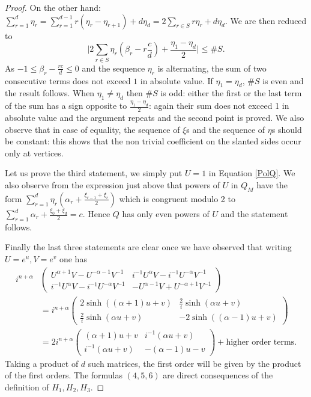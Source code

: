 \documentclass[10pt,a4paper]{amsart}
\begin{document}
\begin{proof}
On the other hand: $\sum_{r=1}^d \eta_r=\sum_{r=1}^{d-1}r(\eta_r-\eta_{r+1})+d\eta_d=2\sum_{r\in S}r\eta_r+d\eta_d$. We are then reduced to 
$$\Big|2\sum_{r\in S}\eta_r(\beta_r-r\frac{c}{d})+\frac{\eta_1-\eta_d}{2}\Big|\le \#S.$$
As $-1\le \beta_r-\frac{rc}{d}\le 0$ and the sequence $\eta_r$ is alternating, the sum of two consecutive terms does not exceed $1$ in absolute value. If $\eta_1=\eta_d$, $\#S$ is even and the result follows. When $\eta_1\ne\eta_d$ then $\#S$ is odd: either the first or the last term of the sum has a sign opposite to $\frac{\eta_1-\eta_d}{2}$: again their sum does not exceed 1 in absolute value and the argument repeats and the second point is proved. 
We also observe that in case of equality, the sequence of $\xi$s and the sequence of $\eta$s should be constant: this shows that the non trivial coefficient on the slanted sides occur only at vertices. 

Let us prove the third statement, we simply put $U=1$ in Equation \eqref{PolQ}. We also observe from the expression just above that powers of $U$ in $Q_M$ have the form $\sum_{r=1}^d \eta_r(\alpha_r+\frac{\xi_{r-1}+\xi_{r}}{2})$ which is congruent modulo 2 to $\sum_{r=1}^{d}\alpha_r+\frac{\xi_0+\xi_d}{2}=c$. Hence $Q$ has only even powers of $U$ and the statement follows. 

Finally the last three statements are clear once we have observed that writing $U=e^u, V=e^v$ one has 
\begin{align*}
i^{n+\alpha}&\begin{pmatrix}U^{\alpha+1}V-U^{-\alpha-1}V^{-1}& i^{-1}U^{\alpha}V-i^{-1}U^{-\alpha}V^{-1}\\ i^{-1}U^{\alpha}V-i^{-1}U^{-\alpha}V^{-1}& -U^{\alpha-1}V+U^{-\alpha+1}V^{-1}\end{pmatrix}\\
&=i^{n+\alpha}\begin{pmatrix} 2\sinh((\alpha+1)u+v) & \frac{2}{i}\sinh(\alpha u+v)\\ \frac{2}{i}\sinh(\alpha u+v) & -2\sinh((\alpha-1)u+v)\end{pmatrix}\\
&=2i^{n+\alpha}\begin{pmatrix} (\alpha+1)u+v & i^{-1}(\alpha u+v)\\ i^{-1}(\alpha u+v) & -(\alpha-1)u-v\end{pmatrix}+\text{higher order terms}.
\end{align*}
Taking a product of $d$ such matrices, the first order will be given by the product of the first orders. The formulas $(4,5,6)$ are direct consequences of the definition of $H_1,H_2,H_3$.  
\end{proof}
\end{document}
